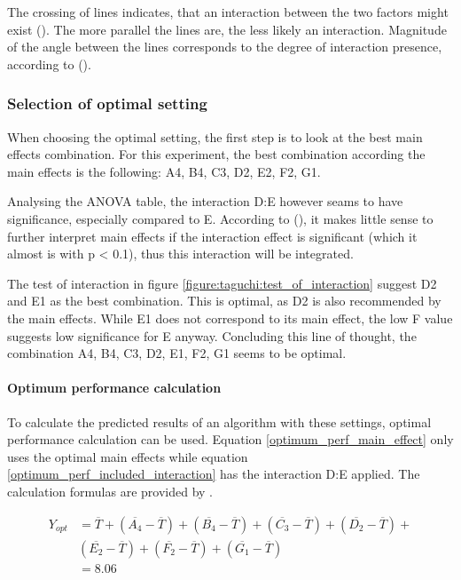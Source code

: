 The crossing of lines indicates, that an interaction between the two factors might exist (\cite{field_discovering_2012}). The more parallel the lines are, the less likely an interaction. Magnitude of the angle between the lines corresponds to the degree of interaction presence, according to (\cite{roy_primer_1990}).

\subsubsection{Selection of optimal setting}
When choosing the optimal setting, the first step is to look at the best main effects combination. For this experiment, the best combination according the main effects is the following: A4, B4, C3, D2, E2, F2, G1.

Analysing the ANOVA table, the interaction D:E however seams to have significance, especially compared to E. According to (\cite{field_discovering_2012}), it makes little sense to further interpret main effects if the interaction effect is significant (which it almost is with p < 0.1), thus this interaction will be integrated.

The test of interaction in figure \ref{figure:taguchi:test_of_interaction} suggest D2 and E1 as the best combination. This is optimal, as D2 is also recommended by the main effects. While E1 does not correspond to its main effect, the low F value suggests low significance for E anyway. Concluding this line of thought, the combination A4, B4, C3, D2, E1, F2, G1 seems to be optimal.

\paragraph{Optimum performance calculation}
\label{para:hyperparameter_tuning:optimum_perf_caluclation}
To calculate the predicted results of an algorithm with these settings, optimal performance calculation can be used. Equation \ref{optimum_perf_main_effect} only uses the optimal main effects while equation \ref{optimum_perf_included_interaction} has the interaction D:E applied. The calculation formulas are provided by \cite{roy_primer_1990}.

\begin{equation} \label{optimum_perf_main_effect}
	\begin{split}
		Y_{opt} &= \overline{T} + (\overline{A_4} - \overline{T}) + (\overline{B_4} - \overline{T}) + (\overline{C_3} - \overline{T}) + (\overline{D_2} - \overline{T}) + \\& (\overline{E_2} - \overline{T}) + (\overline{F_2} - \overline{T}) + (\overline{G_1} - \overline{T}) \\
			&= 8.06
	\end{split}
\end{equation}


